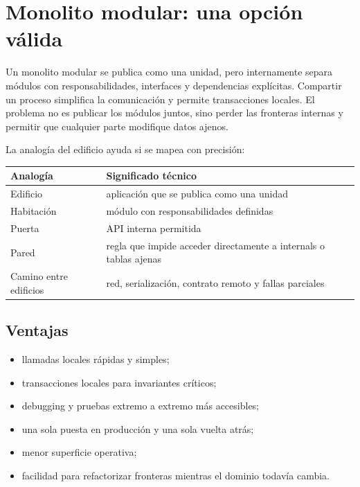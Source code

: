 \documentclass[variant=apuntes,cover=institutional,mode=screen]{ua-engineering-v6-article}
\begin{document}
\section{Monolito modular: una opción válida}

Un monolito modular se publica como una unidad, pero internamente separa módulos con responsabilidades, interfaces y dependencias explícitas. Compartir un proceso simplifica la comunicación y permite transacciones locales. El problema no es publicar los módulos juntos, sino perder las fronteras internas y permitir que cualquier parte modifique datos ajenos.

La analogía del edificio ayuda si se mapea con precisión:

\begin{center}
\begin{tabular}{p{}p{}}
\toprule
\textbf{Analogía} & \textbf{Significado técnico} \\
\midrule
Edificio & aplicación que se publica como una unidad \\
Habitación & módulo con responsabilidades definidas \\
Puerta & API interna permitida \\
Pared & regla que impide acceder directamente a internals o tablas ajenas \\
Camino entre edificios & red, serialización, contrato remoto y fallas parciales \\
\bottomrule
\end{tabular}
\end{center}

\subsection{Ventajas}

\begin{itemize}
\item llamadas locales rápidas y simples;
\item transacciones locales para invariantes críticos;
\item debugging y pruebas extremo a extremo más accesibles;
\item una sola puesta en producción y una sola vuelta atrás;
\item menor superficie operativa;
\item facilidad para refactorizar fronteras mientras el dominio todavía cambia.
\end{itemize}
\end{document}
